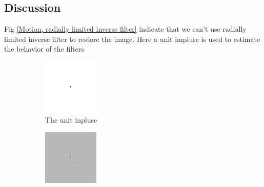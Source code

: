 \documentclass[
	12pt, %
]{style/fphw}
\begin{document}
\subsection*{Discussion}

Fig \ref{Motion, radially limited inverse filter} indicate that we can't use radially limited inverse filter to restore the image. Here a unit impluse is used to estimate the behavior of the filters

\begin{figure}[H]
	\centering
	\begin{subfigure}[b]{.24\textwidth}
		\centering
		\includegraphics[width=0.9\linewidth]{test_input.png}
		\caption{The unit inpluse \\}
		\label{test_input}
	\end{subfigure}
	\hfill
	\begin{subfigure}[b]{.24\textwidth}
		\centering
		\includegraphics[width=0.9\linewidth]{test_input_burl.png}

\end{subfigure}
\end{figure}
\end{document}
